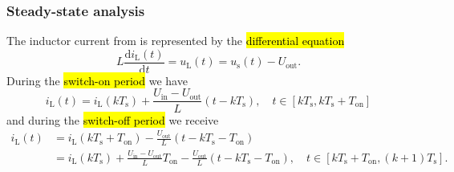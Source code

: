 \begin{frame}
    \frametitle{Steady-state analysis}
    The inductor current from  is represented by the \hl{differential equation}
    \begin{equation}
        L \frac{\mathrm{d}i_\mathrm{L}(t)}{\mathrm{d}t} =  u_\mathrm{L}(t) =  u_\mathrm{s}(t) - U_\mathrm{out}.
    \end{equation}
    During the \hl{switch-on period} we have
    \begin{equation}
        i_\mathrm{L}(t) = i_\mathrm{L}(k T_\mathrm{s}) + \frac{U_\mathrm{in}-U_\mathrm{out}}{L} (t - k T_\mathrm{s}), \quad t\in [k T_\mathrm{s}, k T_\mathrm{s} + T_\mathrm{on}]
    \end{equation}
    and during the \hl{switch-off period} we receive
    \begin{equation}
        \begin{split}
            i_\mathrm{L}(t) &= i_\mathrm{L}(k T_\mathrm{s} + T_\mathrm{on}) - \frac{U_\mathrm{out}}{L} (t - k T_\mathrm{s} - T_\mathrm{on})\\
            \               &= i_\mathrm{L}(k T_\mathrm{s}) + \frac{U_\mathrm{in}-U_\mathrm{out}}{L} T_\mathrm{on} - \frac{U_\mathrm{out}}{L} (t - k T_\mathrm{s} - T_\mathrm{on}), \quad 
            t\in [k T_\mathrm{s} + T_\mathrm{on}, (k+1) T_\mathrm{s}]. 
        \end{split} 
        \label{eq:inductor-current-switch-off}
    \end{equation}
\end{frame}

